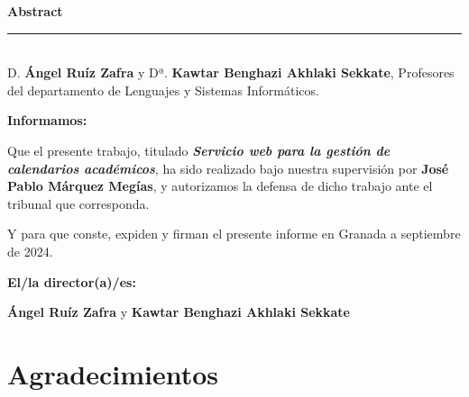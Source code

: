 \noindent\textbf{Abstract}\\


\cleardoublepage

\thispagestyle{empty}

\noindent\rule[-1ex]{\textwidth}{2pt}\\[4.5ex]

D. \textbf{Ángel Ruíz Zafra} y Dª. \textbf{Kawtar Benghazi Akhlaki Sekkate}, Profesores del departamento de Lenguajes y Sistemas Informáticos.
\vspace{0.5cm}

\textbf{Informamos:}

\vspace{0.5cm}

Que el presente trabajo, titulado \textit{\textbf{Servicio web para la gestión de calendarios académicos}},
ha sido realizado bajo nuestra supervisión por \textbf{José Pablo Márquez Megías}, y autorizamos la defensa de dicho trabajo ante el tribunal
que corresponda.

\vspace{0.5cm}

Y para que conste, expiden y firman el presente informe en Granada a septiembre de 2024.

\vspace{1cm}

\textbf{El/la director(a)/es: }

\vspace{5cm}

\noindent \textbf{Ángel Ruíz Zafra} y \textbf{Kawtar Benghazi Akhlaki Sekkate}

\chapter*{Agradecimientos}






